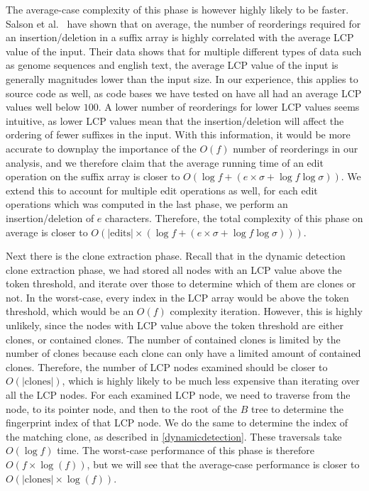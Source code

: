 The average-case complexity of this phase is however highly likely to be faster. Salson et
al.~\cite{DynamicExtendedSuffixArraysReorderings} have shown that on average, the number
of reorderings required for an insertion/deletion in a suffix array is highly correlated
with the average LCP value of the input. Their data shows that for multiple different
types of data such as genome sequences and english text, the average LCP value of the
input is generally magnitudes lower than the input size. In our experience, this applies
to source code as well, as code bases we have tested on have all had an average LCP values
well below $100$. A lower number of reorderings for lower LCP values seems intuitive, as
lower LCP values mean that the insertion/deletion will affect the ordering of fewer
suffixes in the input. With this information, it would be more accurate to downplay the
importance of the $O(f)$ number of reorderings in our analysis, and we therefore claim
that the average running time of an edit operation on the suffix array is closer to $O(\log f +
(e \times \sigma + \log f \log\sigma))$. We extend this to account for multiple edit operations as
well, for each edit operations which was computed in the last phase, we perform an
insertion/deletion of $e$ characters. Therefore, the total complexity of this phase on
average is closer to $O(\vert\text{edits}\vert \times (\log f + (e \times \sigma + \log f
\log\sigma)))$.


Next there is the clone extraction phase. Recall that in the dynamic detection clone
extraction phase, we had stored all nodes with an LCP value above the token threshold, and
iterate over those to determine which of them are clones or not. In the worst-case, every
index in the LCP array would be above the token threshold, which would be an $O(f)$
complexity iteration. However, this is highly unlikely, since the nodes with LCP value
above the token threshold are either clones, or contained clones. The number of contained
clones is limited by the number of clones because each clone can only have a limited
amount of contained clones. Therefore, the number of LCP nodes examined should be closer
to $O(\vert\text{clones}\vert)$, which is highly likely to be much less expensive than
iterating over all the LCP nodes. For each examined LCP node, we need to traverse from the
node, to its pointer node, and then to the root of the $B$ tree to determine the
fingerprint index of that LCP node. We do the same to determine the index of the matching
clone, as described in \cref{dynamicdetection}. These traversals take $O(\log f)$ time.
The worst-case performance of this phase is therefore $O(f \times \log(f))$, but we will
see that the average-case performance is closer to $O(\vert\text{clones}\vert \times
\log(f))$.

